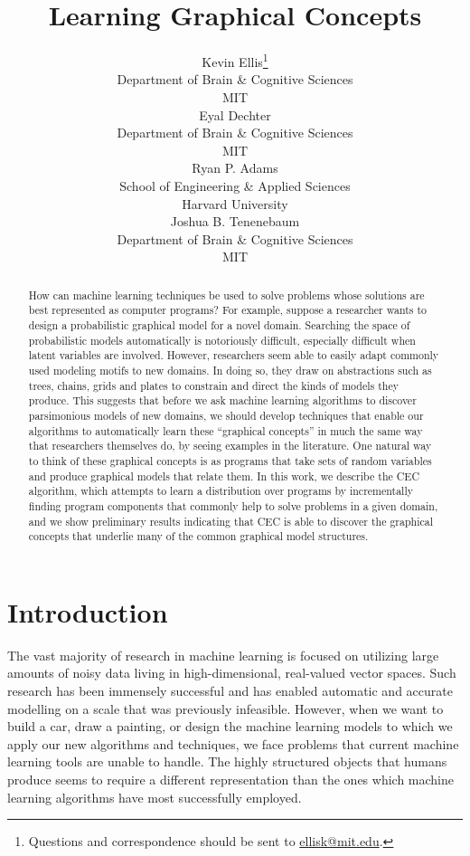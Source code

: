 \documentclass{article} %
\title{Learning Graphical Concepts}
\author{
Kevin Ellis\thanks{Questions and correspondence should be sent to 
\href{mailto:ellisk@mit.edu}{ellisk@mit.edu}.} \\
Department of Brain \& Cognitive Sciences\\
MIT\\
\And
Eyal Dechter \\
Department of Brain \& Cognitive Sciences\\
MIT\\
\AND
Ryan P. Adams \\
School of Engineering \& Applied Sciences \\
Harvard University\\
\And
Joshua B. Tenenebaum \\
Department of Brain \& Cognitive Sciences\\
MIT\\
}
\begin{document}
\maketitle

\begin{abstract}
How can machine learning techniques be used to solve problems whose solutions are best represented as computer programs? For example, suppose a researcher wants to design a probabilistic graphical model for a novel domain. Searching the space of probabilistic models automatically is notoriously difficult, especially difficult when latent variables are involved. However, researchers seem able to easily adapt commonly used modeling motifs to new domains. In doing so, they draw on abstractions such as trees, chains, grids and plates to constrain and direct the kinds of models they produce. This suggests that before we ask machine learning algorithms to discover parsimonious models of new domains, we should develop techniques that enable our algorithms to automatically learn these ``graphical concepts'' in much the same way that researchers themselves do, by seeing examples in the literature. One natural way to think of these graphical concepts is as programs that take sets of random variables and produce graphical models that relate them. In this work, we describe the CEC algorithm, which attempts to learn a distribution over programs by incrementally finding program components that commonly help to solve problems in a given domain, and we show preliminary results indicating that CEC is able to discover the graphical concepts that underlie many of the common graphical model structures.  
\end{abstract}


\section{Introduction}


The vast majority of research in machine learning is focused on utilizing large amounts of noisy data living in high-dimensional, real-valued vector spaces. Such research has been immensely successful and has enabled automatic and accurate modelling on a scale that was previously infeasible. However, when we want to build a car, draw a painting, or design the machine learning models to which we apply our new algorithms and techniques, we face problems that current machine learning tools are unable to handle. The highly structured objects that humans produce seems to require a different representation than the ones which machine learning algorithms have most successfully employed. 
\end{document}
